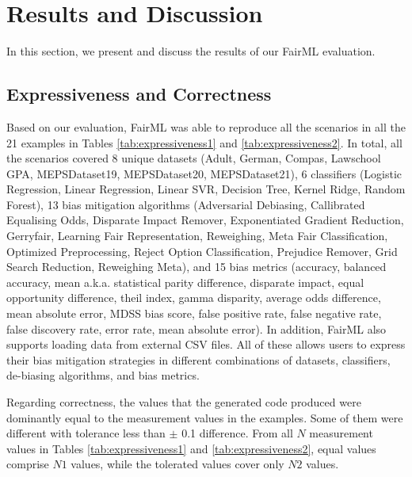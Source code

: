 \documentclass[sigconf,review]{acmart}
\begin{document}




\section{Results and Discussion}
\label{sec:result_and_discussion}
In this section, we present and discuss the results of our FairML evaluation.

\subsection{Expressiveness and Correctness}
\label{sec:expressiveness_and_correctness}
Based on our evaluation, FairML was able to reproduce all the scenarios in all the 21 examples in Tables \ref{tab:expressiveness1} and \ref{tab:expressiveness2}. In total, all the scenarios covered 8 unique datasets (Adult, German, Compas, Lawschool GPA, MEPSDataset19, MEPSDataset20, MEPSDataset21), 6 classifiers (Logistic Regression, Linear Regression, Linear SVR, Decision Tree, Kernel Ridge, Random Forest), 13 bias mitigation algorithms (Adversarial Debiasing, Callibrated Equalising Odds, Disparate Impact Remover, Exponentiated Gradient Reduction, Gerryfair, Learning Fair Representation, Reweighing, Meta Fair Classification, Optimized Preprocessing, Reject Option Classification, Prejudice Remover, Grid Search Reduction, Reweighing Meta), and 15 bias metrics (accuracy, balanced accuracy, mean a.k.a. statistical parity difference, disparate impact, equal opportunity difference, theil index, gamma disparity, average odds difference, mean absolute error, MDSS bias score, false positive rate, false negative rate, false discovery rate, error rate, mean absolute error). In addition, FairML also supports loading data from external CSV files. All of these allows users to express their bias mitigation strategies in different combinations of datasets, classifiers, de-biasing algorithms, and bias metrics.

Regarding correctness, the values that the generated code produced were dominantly equal to the measurement values in the examples. Some of them were different with tolerance less than $\pm$ 0.1 difference. From all $N$ measurement values in Tables \ref{tab:expressiveness1} and \ref{tab:expressiveness2}, equal values comprise $N1$ values, while the tolerated values cover only $N2$ values.  
\end{document}
